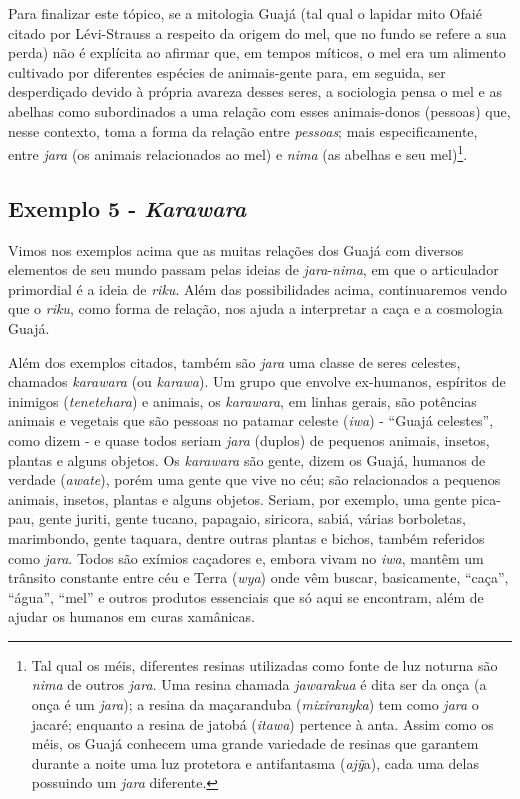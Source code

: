 Para finalizar este tópico, se a mitologia Guajá (tal qual o lapidar
mito Ofaié citado por Lévi-Strauss a respeito da origem do mel, que no
fundo se refere a sua perda) não é explícita ao afirmar que, em tempos
míticos, o mel era um alimento cultivado por diferentes espécies de
animais-gente para, em seguida, ser desperdiçado devido à própria
avareza desses seres, a sociologia pensa o mel e as abelhas como
subordinados a uma relação com esses animais-donos (pessoas) que, nesse
contexto, toma a forma da relação entre \emph{pessoas}; mais
especificamente, entre \emph{jara} (os animais relacionados ao mel) e
\emph{nima} (as abelhas e seu mel)\footnote{Tal qual os méis, diferentes
  resinas utilizadas como fonte de luz noturna são \emph{nima} de outros
  \emph{jara}. Uma resina chamada \emph{jawarakua} é dita ser da onça (a
  onça é um \emph{jara}); a resina da maçaranduba (\emph{mixiranyka})
  tem como \emph{jara} o jacaré; enquanto a resina de jatobá
  (\emph{itawa}) pertence à anta. Assim como os méis, os Guajá conhecem
  uma grande variedade de resinas que garantem durante a noite uma luz
  protetora e antifantasma (\emph{ajỹ}a), cada uma delas possuindo um
  \emph{jara} diferente.}.

\subsection{Exemplo 5 - \emph{Karawara}}

Vimos nos exemplos acima que as muitas relações dos Guajá com diversos
elementos de seu mundo passam pelas ideias de \emph{jara}-\emph{nima},
em que o articulador primordial é a ideia de \emph{riku}. Além das
possibilidades acima, continuaremos vendo que o \emph{riku}, como forma
de relação, nos ajuda a interpretar a caça e a cosmologia Guajá.

Além dos exemplos citados, também são \emph{jara} uma classe de seres
celestes, chamados \emph{karawara} (ou \emph{karawa}). Um grupo que
envolve ex-humanos, espíritos de inimigos (\emph{tenetehara}) e animais,
os \emph{karawara}, em linhas gerais, são potências animais e vegetais
que são pessoas no patamar celeste (\emph{iwa}) - ``Guajá celestes'',
como dizem - e quase todos seriam \emph{jara} (duplos) de pequenos
animais, insetos, plantas e alguns objetos. Os \emph{karawara} são
gente, dizem os Guajá, humanos de verdade (\emph{awate}), porém uma
gente que vive no céu; são relacionados a pequenos animais, insetos,
plantas e alguns objetos. Seriam, por exemplo, uma gente pica-pau, gente
juriti, gente tucano, papagaio, siricora, sabiá, várias borboletas,
marimbondo, gente taquara, dentre outras plantas e bichos, também
referidos como \emph{jara}. Todos são exímios caçadores e, embora vivam
no \emph{iwa}, mantêm um trânsito constante entre céu e Terra
(\emph{wya}) onde vêm buscar, basicamente, ``caça'', ``água'', ``mel'' e
outros produtos essenciais que só aqui se encontram, além de ajudar os
humanos em curas xamânicas.

